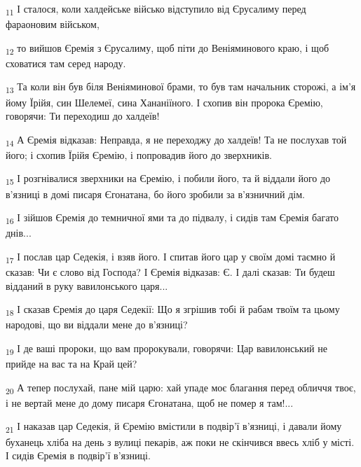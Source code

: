 \begin{tcolorbox}
\textsubscript{11} І сталося, коли халдейське військо відступило від Єрусалиму перед фараоновим військом,
\end{tcolorbox}
\begin{tcolorbox}
\textsubscript{12} то вийшов Єремія з Єрусалиму, щоб піти до Веніяминового краю, і щоб сховатися там серед народу.
\end{tcolorbox}
\begin{tcolorbox}
\textsubscript{13} Та коли він був біля Веніяминової брами, то був там начальник сторожі, а ім'я йому Їрійя, син Шелемеї, сина Хананіїного. І схопив він пророка Єремію, говорячи: Ти переходиш до халдеїв!
\end{tcolorbox}
\begin{tcolorbox}
\textsubscript{14} А Єремія відказав: Неправда, я не переходжу до халдеїв! Та не послухав той його; і схопив Їрійя Єремію, і попровадив його до зверхників.
\end{tcolorbox}
\begin{tcolorbox}
\textsubscript{15} І розгнівалися зверхники на Єремію, і побили його, та й віддали його до в'язниці в домі писаря Єгонатана, бо його зробили за в'язничний дім.
\end{tcolorbox}
\begin{tcolorbox}
\textsubscript{16} І зійшов Єремія до темничної ями та до підвалу, і сидів там Єремія багато днів...
\end{tcolorbox}
\begin{tcolorbox}
\textsubscript{17} І послав цар Седекія, і взяв його. І спитав його цар у своїм домі таємно й сказав: Чи є слово від Господа? І Єремія відказав: Є. І далі сказав: Ти будеш відданий в руку вавилонського царя...
\end{tcolorbox}
\begin{tcolorbox}
\textsubscript{18} І сказав Єремія до царя Седекії: Що я згрішив тобі й рабам твоїм та цьому народові, що ви віддали мене до в'язниці?
\end{tcolorbox}
\begin{tcolorbox}
\textsubscript{19} І де ваші пророки, що вам пророкували, говорячи: Цар вавилонський не прийде на вас та на Край цей?
\end{tcolorbox}
\begin{tcolorbox}
\textsubscript{20} А тепер послухай, пане мій царю: хай упаде моє благання перед обличчя твоє, і не вертай мене до дому писаря Єгонатана, щоб не помер я там!...
\end{tcolorbox}
\begin{tcolorbox}
\textsubscript{21} І наказав цар Седекія, й Єремію вмістили в подвір'ї в'язниці, і давали йому буханець хліба на день з вулиці пекарів, аж поки не скінчився ввесь хліб у місті. І сидів Єремія в подвір'ї в'язниці.
\end{tcolorbox}
